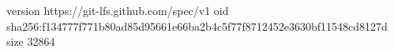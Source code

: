 version https://git-lfs.github.com/spec/v1
oid sha256:f134777f771b80ad85d95661e66ba2b4c5f77f8712452e3630bf11548cd8127d
size 32864
